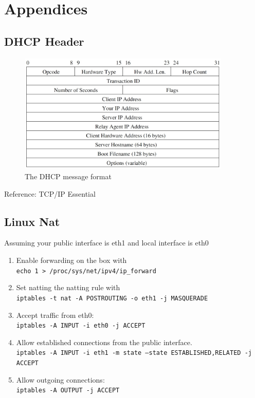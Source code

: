 \documentclass[10pt,a4paper]{article}
\numberwithin{equation}{section}
\numberwithin{figure}{section}
\numberwithin{table}{section}
\begin{document}

\appendix
\section*{Appendices}
\renewcommand{\thesubsection}{\Alph{subsection}}

\subsection{DHCP Header}
\begin{figure}[H]
    \centering
    \includegraphics[width=0.9\textwidth]{img/dhcp-header.png}
    \caption{The DHCP message format}
\end{figure}
Reference: TCP/IP Essential
\subsection{Linux Nat}
Assuming your public interface is eth1 and local interface is eth0
\begin{enumerate}
    \item Enable forwarding on the box with\\
    \texttt{echo 1 > /proc/sys/net/ipv4/ip\_forward}
    \item Set natting the natting rule with\\
    \texttt{iptables -t nat -A POSTROUTING -o eth1 -j MASQUERADE}
    \item Accept traffic from eth0:\\
    \texttt{iptables -A INPUT -i eth0 -j ACCEPT}
    \item Allow established connections from the public interface.\\
    \texttt{iptables -A INPUT -i eth1 -m state --state ESTABLISHED,RELATED -j ACCEPT}
    \item Allow outgoing connections:\\
    \texttt{iptables -A OUTPUT -j ACCEPT}
\end{enumerate}
\end{document}
